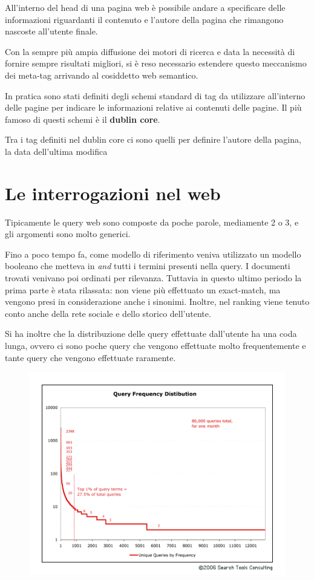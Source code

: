 All'interno del head di una pagina web è possibile andare a specificare delle informazioni riguardanti il contenuto e l'autore della pagina che rimangono nascoste all'utente finale.

Con la sempre più ampia diffusione dei motori di ricerca e data la necessità di fornire sempre risultati migliori, si è reso necessario estendere questo meccanismo dei meta-tag arrivando al cosiddetto web semantico.

In pratica sono stati definiti degli schemi standard di tag da utilizzare all'interno delle pagine per indicare le informazioni relative ai contenuti delle pagine.
Il più famoso di questi schemi è il \textbf{dublin core}.

Tra i tag definiti nel dublin core ci sono quelli per definire l'autore della pagina, la data dell'ultima modifica 

\section{Le interrogazioni nel web}

Tipicamente le query web sono composte da poche parole, mediamente 2 o 3, e gli argomenti sono molto generici.

Fino a poco tempo fa, come modello di riferimento veniva utilizzato un modello booleano che metteva in \textit{and} tutti i termini presenti nella query. I documenti trovati venivano poi ordinati per rilevanza.
Tuttavia in questo ultimo periodo la prima parte è stata rilassata: non viene più effettuato un exact-match, ma vengono presi in considerazione anche i sinonimi. Inoltre, nel ranking viene tenuto conto anche della rete sociale e dello storico dell'utente.

Si ha inoltre che la distribuzione delle query effettuate dall'utente ha una coda lunga, ovvero ci sono poche query che vengono effettuate molto frequentemente e tante query che vengono effettuate raramente.

\begin{figure}[htbp]
	\centering
	\includegraphics[width=.6\textwidth]{images/l18-fig-1.png}
\end{figure}

